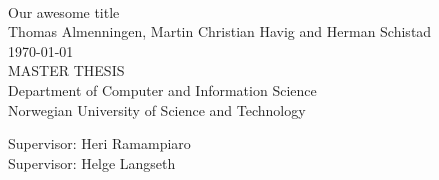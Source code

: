 \documentclass[10pt,a4paper,oneside]{report}
\newcommand{\HRule}{\rule{\linewidth}{0.5mm}} %
\def \thesistitle{Our awesome title}
\def \authorname{Thomas Almenningen, Martin Christian Havig and Herman Schistad}
\def \supheri{Heri Ramampiaro}
\def \suphelge{Helge Langseth}
\begin{document}

\begin{titlepage}
\begin{center}
\mbox{}\\[6pc]
\begin{center}
\Huge{\thesistitle}\\[2pc]

\Large{\authorname}\\[1pc]
\large{\today}\\[2pc]

MASTER THESIS\\
Department of Computer and Information Science\\
Norwegian University of Science and Technology
\end{center}
\vfill

\noindent Supervisor: \supheri \\
\noindent Supervisor: \suphelge

%



\end{center}
\end{titlepage}
\end{document}

